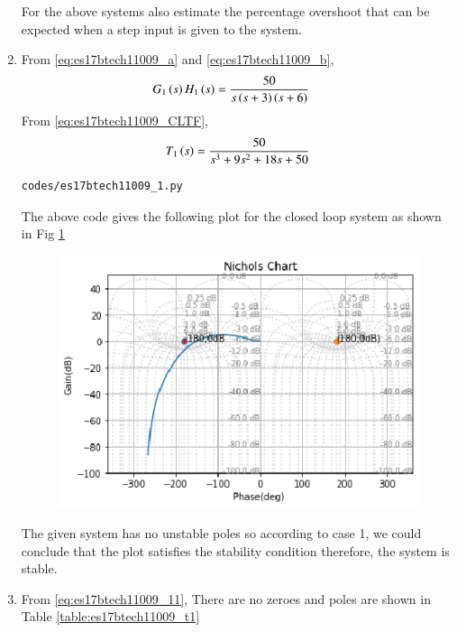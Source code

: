 \begin{enumerate}[label=\thesection.\arabic*.,ref=\thesection.\theenumi]
For the above systems also estimate the percentage overshoot that can be expected when a step input is given to the system.
\item
From \eqref{eq:es17btech11009_a} and \eqref{eq:es17btech11009_b},
\begin{align}
G_{1}\brak{s}H_{1}\brak{s}&= \frac{50}{s\brak{s+3}\brak{s+6}}
\label{eq:es17btech11009_aa}
\end{align}
\solution
 From \eqref{eq:es17btech11009_CLTF},
 \begin{align}
T_{1}\brak{s} = \frac{50}{s^3 + 9s^2 + 18s + 50}
\label{eq:es17btech11009_11}
 \end{align}
\begin{lstlisting}
codes/es17btech11009_1.py
\end{lstlisting}
The above code gives the following plot for the closed loop system as shown in Fig \ref{fig:es17btech11009_fig1}
\begin{figure}[!h]
\centering
\includegraphics[width=\columnwidth]{./figs/es17btech11009_1.eps}
\caption{}
\label{fig:es17btech11009_fig1}
\end{figure}
The given system has no unstable poles so according to case 1, we could conclude that the plot satisfies the stability condition therefore, the system is stable.

\item
From \eqref{eq:es17btech11009_11},
There are no zeroes and poles are shown in Table \ref{table:es17btech11009_t1}


\end{enumerate}
